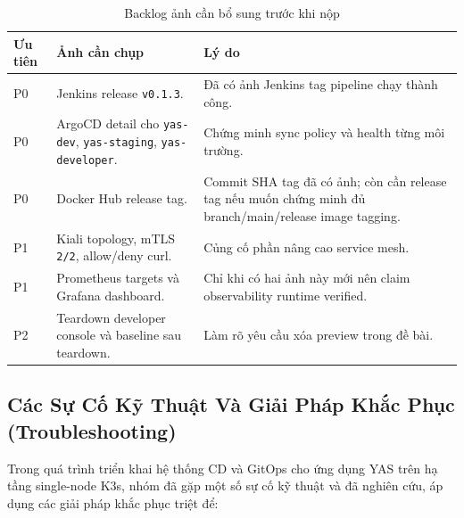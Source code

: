 \begin{table}[H]
\centering
\caption{Backlog ảnh cần bổ sung trước khi nộp}
\begin{tabular}{|p{2cm}|p{4.3cm}|p{7.2cm}|}
\hline
\textbf{Ưu tiên} & \textbf{Ảnh cần chụp} & \textbf{Lý do} \\
\hline
P0 & Jenkins release \texttt{v0.1.3}. & Đã có ảnh Jenkins tag pipeline chạy thành công. \\
\hline
P0 & ArgoCD detail cho \texttt{yas-dev}, \texttt{yas-staging}, \texttt{yas-developer}. & Chứng minh sync policy và health từng môi trường. \\
\hline
P0 & Docker Hub release tag. & Commit SHA tag đã có ảnh; còn cần release tag nếu muốn chứng minh đủ branch/main/release image tagging. \\
\hline
P1 & Kiali topology, mTLS \texttt{2/2}, allow/deny curl. & Củng cố phần nâng cao service mesh. \\
\hline
P1 & Prometheus targets và Grafana dashboard. & Chỉ khi có hai ảnh này mới nên claim observability runtime verified. \\
\hline
P2 & Teardown developer console và baseline sau teardown. & Làm rõ yêu cầu xóa preview trong đề bài. \\
\hline
\end{tabular}
\end{table}

\subsection{Các Sự Cố Kỹ Thuật Và Giải Pháp Khắc Phục (Troubleshooting)}

Trong quá trình triển khai hệ thống CD và GitOps cho ứng dụng YAS trên hạ tầng single-node K3s, nhóm đã gặp một số sự cố kỹ thuật và đã nghiên cứu, áp dụng các giải pháp khắc phục triệt để:

